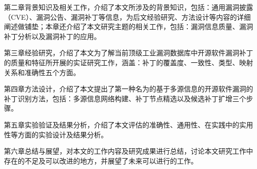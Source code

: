 第二章背景知识及相关工作，介绍了本文所涉及的背景知识，包括：通用漏洞披露（CVE）、漏洞公告、漏洞补丁等信息，为后文经验研究、方法设计等内容的详细阐述做铺垫；本章还介绍了本文研究主题的相关工作，包括：漏洞信息质量、漏洞补丁分析以及漏洞补丁的应用。

第三章经验研究，介绍了本文为了解当前顶级工业漏洞数据库中开源软件漏洞补丁的质量和特征所开展的实证研究工作，涵盖：补丁的覆盖度、一致性、类型、映射关系和准确性五个方面。

第四章\tool 方法设计，介绍了本文提出了第一种名为\tool 的基于多源信息的开源软件漏洞的补丁识别方法，包括：多源信息网络构建、补丁节点精选以及候选补丁扩增三个步骤。

第五章实验验证及结果分析，介绍了本文评估\tool 的准确性、通用性、在实践中的实用性等方面的实验设计及结果分析。

第六章总结与展望，对本文的工作内容及研究成果进行总结，讨论本文研究工作中存在的不足及可以改进的地方，并展望了未来可以进行的工作。
